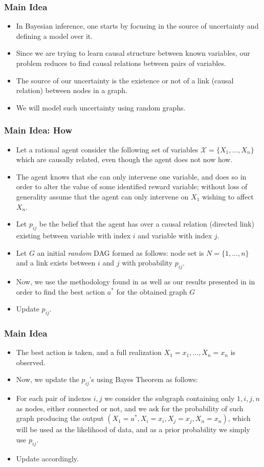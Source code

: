 \documentclass{beamer}
\theoremstyle{plain}
\begin{document}
\begin{frame}
\frametitle{Main Idea}
\begin{itemize}
\item In Bayesian inference, one starts by focusing in the source of uncertainty and defining a model over it.
\item Since we are trying to learn causal structure between known variables, our problem reduces to find causal relations between pairs of variables.
\item The source of our uncertainty is the existence or not of a link (causal relation) between nodes in a graph. 
\item We will model such uncertainty using random graphs.
\end{itemize}
\end{frame}

\begin{frame}
\frametitle{Main Idea: How}
\begin{itemize}
\item Let a rational agent consider the following set of variables $\mathcal{X}=\{ X_1,...,X_n \}$ which are causally related, even though the agent does not now how.
\item The agent knows that she can only intervene one variable, and does so in order to alter the value of some  identified reward variable; without loss of generality assume that the agent can only intervene on $X_1$ wishing to affect $X_n$.
\item Let $p_{ij}$ be the belief that the agent has over a causal relation (directed link) existing between variable with index $i$ and variable with index $j$.
\item Let $G$ an initial {\em random} DAG formed as follows: node set is $N=\{1,...,n\}$ and a link exists between $i$ and $j$ with probability $p_{ij}$.
\item Now, we use the methodology found in \cite{gonzalez2018playing}  as well as our results presented in \cite{gonzalez2019theorems} in order to find the best action $a^\ast$ for the obtained graph $G$
\item Update $p_{ij}$.
\end{itemize}
\end{frame}

\begin{frame}
\frametitle{Main Idea}
\begin{itemize}
\item The best action is taken, and a full realization $X_1=x_1,...,X_n=x_n$ is observed.
\item Now, we update the $p_{ij}$'s using Bayes Theorem as follows:
\item For each pair of indexes $i,j$ we consider the subgraph containing only $1,i,j,n$ as nodes, either connected or not, and we ask for the probability of such graph producing the output $(X_1 = a^\ast, X_i = x_i, X_j=x_j, X_n=x_n)$, which will be used as the likelihood of data, and as a prior probability we simply use $p_{ij}$.
\item Update accordingly.
\end{itemize}
\end{frame}
\end{document}

